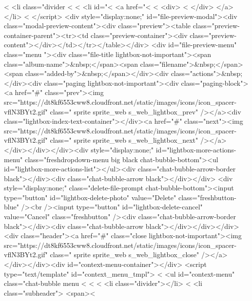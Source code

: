 {<%
  <li class="divider <%
<%
  <li id="<%
    <a href="<%
      <%
      <div>
          <%
      </div>
    </a>
  </li>
<%
</script>
<div style="display:none;" id="file-preview-modal"><div class="modal-preview-content"><div class="preview"><table class="preview-container-parent"><tr><td class="preview-container"><div class="preview-content"></div></td></tr></table></div> <div id="file-preview-menu" class="menu "><div class="file-title lightbox-not-important"><span class="album-name">&nbsp;</span><span class="filename">&nbsp;</span><span class="added-by">&nbsp;</span></div><div class="actions">&nbsp;</div><div class="paging lightbox-not-important"><div class="paging-block"><a href="#" class="prev"><img src="https://dt8kf6553cww8.cloudfront.net/static/images/icons/icon_spacer-vflN3BYt2.gif" class=" sprite sprite_web s_web_lightbox_prev" /></a><div class="lightbox-index-text-container"></div><a href="#" class="next"><img src="https://dt8kf6553cww8.cloudfront.net/static/images/icons/icon_spacer-vflN3BYt2.gif" class=" sprite sprite_web s_web_lightbox_next" /></a></div></div></div><div style="display:none;" id="lightbox-more-actions-menu" class="freshdropdown-menu big black chat-bubble-bottom"><ul id="lightbox-more-actions-list"></ul><div class="chat-bubble-arrow-border black"></div><div class="chat-bubble-arrow black"></div></div> <div style="display:none;" class="delete-file-prompt chat-bubble-bottom"><input type="button" id="lightbox-delete-photo" value="Delete" class="freshbutton-blue" /><br /><input type="button" id="lightbox-delete-cancel" value="Cancel" class="freshbutton" /><div class="chat-bubble-arrow-border black"></div><div class="chat-bubble-arrow black"></div></div></div><div class="header"><a href="#" class="close lightbox-not-important"><img src="https://dt8kf6553cww8.cloudfront.net/static/images/icons/icon_spacer-vflN3BYt2.gif" class=" sprite sprite_web s_web_lightbox_close" /></a></div></div><div id="context-menu-container"></div>
<script type="text/template" id="context_menu_tmpl">
  <%
    <ul id="context-menu" class="chat-bubble menu <%
  <%
      <%
        <li class="divider"></li>
      <%
        <li class="subheader">
            <span><%
}
